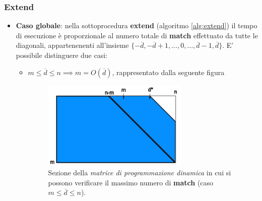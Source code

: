 \subsubsection{Extend}
\begin{itemize}
    \item \textbf{Caso globale}: nella sottoprocedura \textbf{extend} (algoritmo \ref{alg:extend}) il tempo di esecuzione è proporzionale al numero totale di \textbf{match} effettuato da tutte le diagonali, appartenenenti all'insieme $\{-\overline{d}, -\overline{d} + 1, ..., 0, ..., \overline{d}-1, \overline{d}\}$.
        E' possibile distinguere due casi:
        \begin{itemize}
            \item $m \leq \overline{d} \leq n \implies m = O(\overline{d})$, rappresentato dalla seguente figura
            \vspace{20pt}
                \begin{figure}[h]
                    \centering
                    \includegraphics[width=0.7\textwidth]{images/wfa_extend_matrix_1.png}
                    \caption{Sezione della \emph{matrice di programmazione dinamica} in cui si possono verificare il massimo numero di \textbf{match} (caso $m \leq \overline{d} \leq n$).}
                    \label{fig:wf_extend_matrix_1}
                \end{figure}
    

\end{itemize}
\end{itemize}

